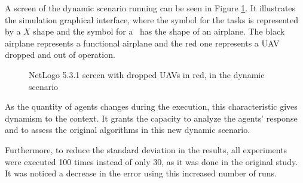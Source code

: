 A screen of the dynamic scenario running can be seen in Figure \ref{fig:screen01}. It illustrates the simulation graphical interface, where the symbol for the tasks is represented by a $X$ shape and the symbol for a \uav\ has the shape of an airplane. The black airplane represents a functional airplane and the red one represents a UAV dropped and out of operation.

\begin{figure}[h!]
	\begin{center}
		\caption{NetLogo 5.3.1 screen with dropped UAVs in red, in the dynamic scenario}
		\label{fig:screen01}
	\end{center}
\end{figure}

As the quantity of agents changes during the execution, this characteristic gives dynamism to the context. It grants the capacity to analyze the agents' response and to assess the original algorithms in this new dynamic scenario. 

Furthermore, to reduce the standard deviation in the results, all experiments were executed 100 times instead of only 30, as it was done in the original study. It was noticed a decrease in the error using this increased number of runs.